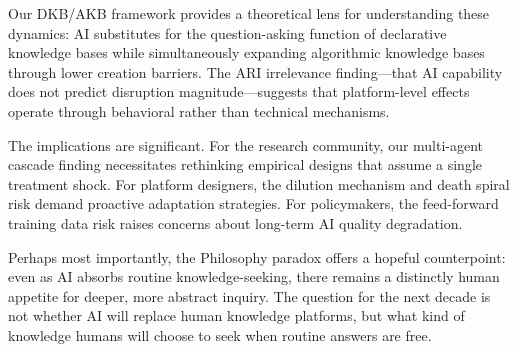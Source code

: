 \documentclass[11pt,a4paper]{article}
\begin{document}
Our DKB/AKB framework provides a theoretical lens for understanding these dynamics: AI substitutes for the question-asking function of declarative knowledge bases while simultaneously expanding algorithmic knowledge bases through lower creation barriers. The ARI irrelevance finding---that AI capability does not predict disruption magnitude---suggests that platform-level effects operate through behavioral rather than technical mechanisms.

The implications are significant. For the research community, our multi-agent cascade finding necessitates rethinking empirical designs that assume a single treatment shock. For platform designers, the dilution mechanism and death spiral risk demand proactive adaptation strategies. For policymakers, the feed-forward training data risk raises concerns about long-term AI quality degradation.

Perhaps most importantly, the Philosophy paradox offers a hopeful counterpoint: even as AI absorbs routine knowledge-seeking, there remains a distinctly human appetite for deeper, more abstract inquiry. The question for the next decade is not whether AI will replace human knowledge platforms, but what kind of knowledge humans will choose to seek when routine answers are free.
\end{document}
